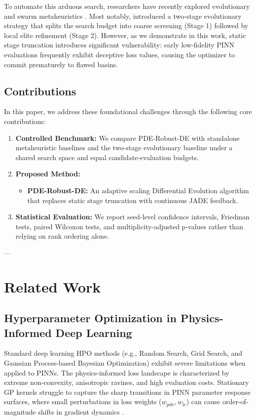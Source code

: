 \documentclass[authoryear,preprint,12pt]{elsarticle}
\begin{document}
To automate this arduous search, researchers have recently explored evolutionary and swarm metaheuristics \citep{jasim2026evopinn, buzaev2026evolutionary}. Most notably, \citet{buzaev2026evolutionary} introduced a two-stage evolutionary strategy that splits the search budget into coarse screening (Stage 1) followed by local elite refinement (Stage 2). However, as we demonstrate in this work, static stage truncation introduces significant vulnerability: early low-fidelity PINN evaluations frequently exhibit deceptive loss values, causing the optimizer to commit prematurely to flawed basins.

\subsection{Contributions}
In this paper, we address these foundational challenges through the following core contributions:
\begin{enumerate}
    \item \textbf{Controlled Benchmark:} We compare PDE-Robust-DE with standalone metaheuristic baselines and the two-stage evolutionary baseline under a shared search space and equal candidate-evaluation budgets.
    \item \textbf{Proposed Method:}
    \begin{itemize}
        \item \textbf{PDE-Robust-DE:} An adaptive scaling Differential Evolution algorithm that replaces static stage truncation with continuous JADE feedback.
    \end{itemize}
    \item \textbf{Statistical Evaluation:} We report seed-level confidence intervals, Friedman tests, paired Wilcoxon tests, and multiplicity-adjusted p-values rather than relying on rank ordering alone.
\end{enumerate}

---

\section{Related Work}
\label{sec:related_work}

\subsection{Hyperparameter Optimization in Physics-Informed Deep Learning}
Standard deep learning HPO methods (e.g., Random Search, Grid Search, and Gaussian Process-based Bayesian Optimization) exhibit severe limitations when applied to PINNs. The physics-informed loss landscape is characterized by extreme non-convexity, anisotropic ravines, and high evaluation costs. Stationary GP kernels struggle to capture the sharp transitions in PINN parameter response surfaces, where small perturbations in loss weights ($w_{\text{pde}}, w_{\text{ic}}$) can cause order-of-magnitude shifts in gradient dynamics \citep{wang2021understanding}.
\end{document}
